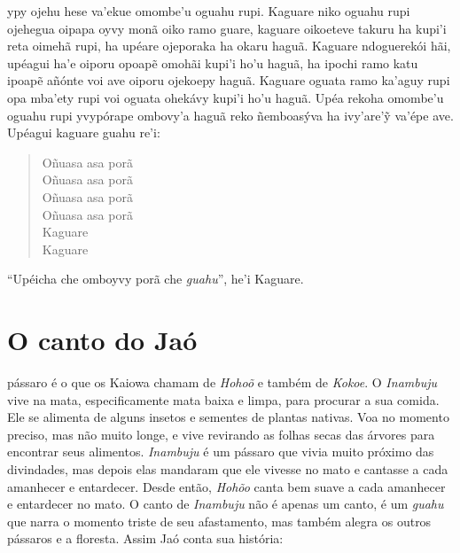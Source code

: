  ypy ojehu hese va'ekue omombe'u
oguahu rupi. Kaguare niko oguahu rupi ojehegua oipapa oyvy monã oiko ramo guare, kaguare oikoeteve takuru ha kupi'i reta oimehã rupi, ha
upéare ojeporaka ha okaru haguã. Kaguare ndoguerekói hãi, upéagui ha'e
oiporu opoapẽ omohãi kupi'i ho'u haguã, ha ipochi ramo katu ipoapẽ
añónte voi ave oiporu ojekoepy haguã. Kaguare oguata ramo ka'aguy rupi
opa mba'ety rupi voi oguata ohekávy kupi'i ho'u haguã. Upéa rekoha
omombe'u oguahu rupi yvypórape ombovy'a haguã reko ñemboasýva ha
ivy'are'ỹ va'épe ave. Upéagui kaguare guahu re'i:


\begin{verse}
Oñuasa asa porã\\
Oñuasa asa porã\\
Oñuasa asa porã\\
Oñuasa asa porã\\
Kaguare\\
Kaguare
\end{verse}


``Upéicha che omboyvy porã che \textit{guahu}'', he'i Kaguare.


\chapter{O canto do Jaó}

 pássaro é o que os Kaiowa chamam de \textit{Hohoõ} e também de
\textit{Kokoe}. O \textit{Inambuju} vive na mata, especificamente mata baixa e
limpa, para procurar a sua comida. Ele se alimenta de alguns insetos e
sementes de plantas nativas. Voa no momento preciso, mas não muito
longe, e vive revirando as folhas secas das árvores para encontrar seus
alimentos. \textit{Inambuju} é um pássaro que vivia muito próximo das
divindades, mas depois elas mandaram que ele vivesse no mato e cantasse
a cada amanhecer e entardecer. Desde então, \textit{Hohõo} canta bem suave
a cada amanhecer e entardecer no mato. O canto de \textit{Inambuju} não é apenas
um canto, é um \textit{guahu} que narra o momento triste de seu
afastamento, mas também alegra os outros pássaros e a floresta. Assim
Jaó conta sua história:

